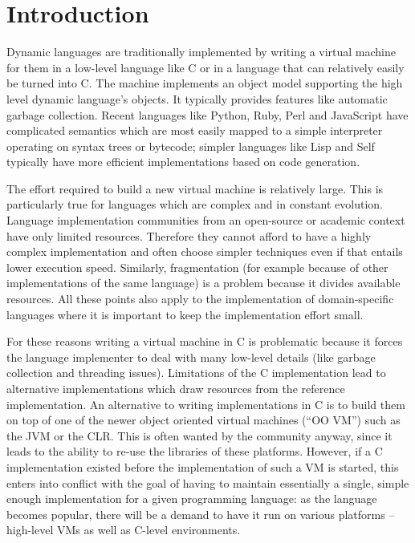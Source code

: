 \documentclass{llncs}
\begin{document}
\section{Introduction}

Dynamic languages are traditionally implemented by writing a virtual
machine for them in a low-level language like C or in a language that
can relatively easily be turned into C.  The machine implements an
object model supporting the high level dynamic language's objects.  It
typically provides features like automatic garbage collection.  Recent
languages like Python, Ruby, Perl and JavaScript have complicated
semantics which are most easily mapped to a simple interpreter operating
on syntax trees or bytecode; simpler languages like Lisp and Self
typically have more efficient implementations based on code
generation.

The effort required to build a new virtual machine is relatively
large.  This is particularly true for languages which are complex
and in constant evolution. Language implementation communities from an
open-source or academic context have only limited resources. Therefore they
cannot afford to have a highly complex implementation and often choose simpler
techniques even if that entails lower execution speed. Similarly, fragmentation
(for example because of other implementations of the same language) is a
problem because it divides available resources. All these points also apply to
the implementation of domain-specific languages where it is important to keep
the implementation effort small.

For these reasons writing a virtual machine in C is problematic because it
forces the language implementer to deal with many low-level details (like
garbage collection and threading issues). Limitations
of the C implementation lead to alternative implementations which draw
resources from the reference implementation. An alternative to writing
implementations in C is to build them on top of one of the newer object oriented
virtual machines (``OO VM'') such as the JVM or the CLR. This is often wanted by
the community anyway, since it leads to the ability to re-use the libraries of
these platforms. However, if a C implementation existed before the
implementation of such a VM is started, this enters into conflict with the goal of
having to maintain essentially a single, simple enough implementation for a
given programming language: as the language becomes popular, there will be a
demand to have it run on various platforms -- high-level VMs as well as
C-level environments.
\end{document}
